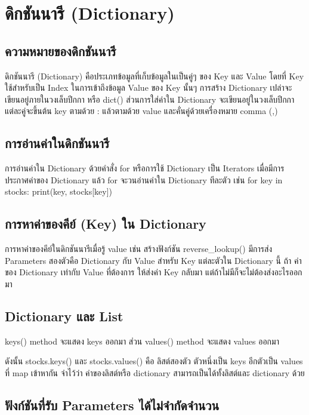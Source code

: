\chapter{ดิกชันนารี (Dictionary)}
\section{ความหมายของดิกชันนารี}

ดิกชันนารี (Dictionary) คือประเภทข้อมูลที่เก็บข้อมูลในเป็นคู่ๆ ของ Key และ Value โดยที่ Key ใช้สำหรับเป็น Index ในการเข้าถึงข้อมูล Value ของ Key นั้นๆ การสร้าง Dictionary เปล่าจะเขียนอยู่ภายในวงเล็บปีกกา { } หรือ dict() ส่วนการใส่ค่าใน Dictionary จะเขียนอยู่ในวงเล็บปีกกา แต่ละคู่จะขึ้นต้น key ตามด้วย : แล้วตามด้วย value และคั่นคู่ด้วยเครื่องหมาย comma (,) 

\section{การอ่านค่าในดิกชันนารี}

การอ่านค่าใน Dictionary ด้วยคำสั่ง for หรือการใช้ Dictionary เป็น Iterators เมื่อมีการประกาศค่าของ Dictionary แล้ว for จะวนอ่านค่าใน Dictionary ทีละตัว เช่น for key in stocks: print(key, stocks[key])

\section{การหาค่าของคีย์ (Key) ใน Dictionary}
การหาค่าของคีย์ในดิกชันนารีเมื่อรู้ value เช่น สร้างฟังก์ชัน reverse_lookup() มีการส่ง Parameters สองตัวคือ Dictionary กับ Value สำหรับ Key แต่ละตัวใน Dictionary นี้ ถ้า ค่าของ Dictionary เท่ากับ Value ที่ต้องการ ให้ส่งค่า Key กลับมา แต่ถ้าไม่มีก็จะไม่ต้องส่งอะไรออกมา

\section{Dictionary และ List}

keys() method จะแสดง keys ออกมา ส่วน values() method จะแสดง values ออกมา 

ดังนั้น stocks.keys() และ stocks.values() คือ ลิสต์สองตัว ตัวหนึ่งเป็น keys อีกตัวเป็น values ที่ map เข้าหากัน จำไว้ว่า ค่าของลิสต์หรือ dictionary สามารถเป็นได้ทั้งลิสต์และ dictionary ด้วย

\section{ฟังก์ชันที่รับ Parameters ได้ไม่จำกัดจำนวน }

